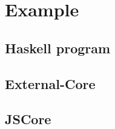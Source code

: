 
\section{Example}

\subsection{Haskell program}



\subsection{External-Core}



\subsection{JSCore}

